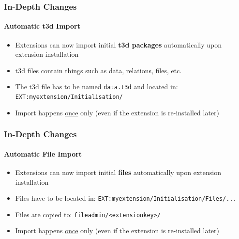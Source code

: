 
\begin{frame}[fragile]
	\frametitle{In-Depth Changes}
	\framesubtitle{Automatic t3d Import}

	\begin{itemize}
		\item Extensions can now import initial \textbf{t3d packages} automatically\newline
			upon extension installation
		\item t3d files contain things such as data, relations, files, etc.
		\item The t3d file has to be named \texttt{data.t3d} and located in:\newline
			\texttt{EXT:myextension/Initialisation/}

		\item Import happens \underline{once} only\newline
			(even if the extension is re-installed later)

	\end{itemize}

\end{frame}


\begin{frame}[fragile]
	\frametitle{In-Depth Changes}
	\framesubtitle{Automatic File Import}

	\begin{itemize}
		\item Extensions can now import initial \textbf{files} automatically\newline
			upon extension installation
		\item Files have to be located in:\newline
			\texttt{EXT:myextension/Initialisation/Files/...}
		\item Files are copied to:\newline
			\texttt{fileadmin/<extensionkey>/}
		\item Import happens \underline{once} only\newline
			(even if the extension is re-installed later)

	\end{itemize}

\end{frame}

